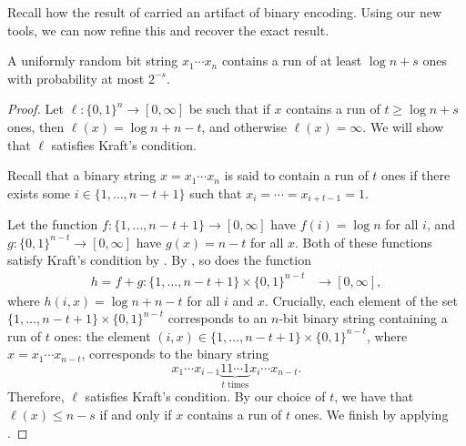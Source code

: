 Recall how the result of  carried an artifact of
binary encoding. Using our new tools, we can now refine this and
recover the exact result.
\begin{prop}
  A uniformly random bit string $x_1 \cdots x_n$ contains a run of at
  least $\log n + s$ ones with probability at most $2^{-s}$.
\end{prop}
\begin{proof}
  Let $\ell : \{0, 1\}^n \to [0, \infty]$ be such that if $x$ contains
  a run of $t \geq \log n + s$ ones, then $\ell(x) = \log n + n - t$,
  and otherwise $\ell(x) = \infty$. We will show that $\ell$ satisfies
  Kraft's condition.

  Recall that a binary string $x = x_1 \cdots x_n$ is said to contain
  a run of $t$ ones if there exists some
  $i \in \{1, \ldots, n - t + 1\}$ such that
  $x_i = \cdots = x_{i + t - 1} = 1$.

  Let the function $f : \{1, \ldots, n - t + 1\} \to [0, \infty]$ have
  $f(i) = \log n$ for all $i$, and
  $g : \{0, 1\}^{n - t} \to [0, \infty]$ have $g(x) = n - t$ for all
  $x$. Both of these functions satisfy Kraft's condition by
  . By , so does
  the function
  \begin{align*}
    h = f + g : \{1, \ldots, n - t + 1\} \times \{0, 1\}^{n - t} &\to
    [0, \infty],
  \end{align*}
  where $h(i, x) = \log n + n - t$ for all $i$ and $x$. Crucially,
  each element of the set
  $\{1, \ldots, n - t + 1\} \times \{0, 1\}^{n - t}$ corresponds to an
  $n$-bit binary string containing a run of $t$ ones: the element
  $(i, x) \in \{1, \ldots, n - t + 1\} \times \{0, 1\}^{n - t}$, where
  $x = x_1 \cdots x_{n - t}$, corresponds to the binary string
  \[x_1 \cdots x_{i - 1} \underbrace{1 1 \cdots 1}_{\text{$t$ times}} x_i \cdots x_{n - t}.\]
  Therefore, $\ell$ satisfies Kraft's condition. By our choice of
  $t$, we have that $\ell(x) \leq n - s$ if and only if $x$ contains a
  run of $t$ ones. We finish by applying .
\end{proof}

